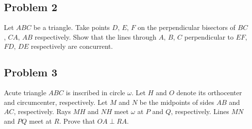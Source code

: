 \subsection{Problem 2}

Let $ABC$ be a triangle. Take points $D$, $E$, $F$ on the perpendicular bisectors of $BC$, $CA$, $AB$ respectively. Show that the lines through $A$, $B$, $C$ perpendicular to $EF$, $FD$, $DE$ respectively are concurrent.



\subsection{Problem 3}

Acute triangle $ABC$ is inscribed in circle $\omega$. Let $H$ and $O$ denote its orthocenter and circumcenter, respectively. Let $M$ and $N$ be the midpoints of sides $AB$ and $AC$, respectively. Rays $MH$ and $NH$ meet $\omega$ at $P$ and $Q$, respectively. Lines $MN$ and $PQ$ meet at $R$. Prove that $OA\perp RA$.

